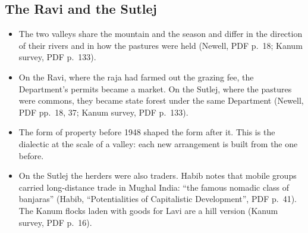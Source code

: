 \documentclass[11pt,a4paper]{article}
\newcommand{\cit}[1]{{\small(#1)}}
\newcommand{\Habib}{Habib, \enquote{Potentialities of Capitalistic Development}}
\begin{document}
\subsection{The Ravi and the Sutlej}
\begin{itemize}
\item The two valleys share the mountain and the season and differ in the
  direction of their rivers and in how the pastures were held \cit{Newell, PDF
  p.~18; Kanum survey, PDF p.~133}.
\item On the Ravi, where the raja had farmed out the grazing fee, the
  Department's permits became a market. On the Sutlej, where the pastures were
  commons, they became state forest under the same Department
  \cit{Newell, PDF pp.~18, 37; Kanum survey, PDF p.~133}.
\item The form of property before 1948 shaped the form after it. This is the
  dialectic at the scale of a valley: each new arrangement is built from the
  one before.
\item On the Sutlej the herders were also traders. Habib notes that mobile
  groups carried long-distance trade in Mughal India: \enquote{the famous nomadic
  class of banjaras} \cit{\Habib, PDF p.~41}. The Kanum flocks laden with
  goods for Lavi are a hill version \cit{Kanum survey, PDF p.~16}.
\end{itemize}
\end{document}
